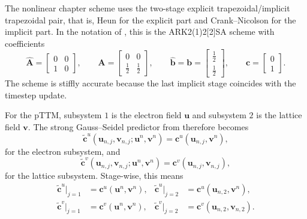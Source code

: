 The nonlinear chapter scheme uses the two-stage explicit trapezoidal/implicit trapezoidal pair, that is, Heun for the explicit part and Crank--Nicolson for the implicit part. In the notation of \cite{Kennedy_2003,Ascher_1997}, this is the ARK2(1)2[2]SA scheme with coefficients
\begin{equation}
    \hat{\mathbf{A}}
    =
    \begin{bmatrix}
        0 & 0 \\
        1 & 0
    \end{bmatrix},
    \qquad
    \mathbf{A}
    =
    \begin{bmatrix}
        0           & 0           \\
        \frac{1}{2} & \frac{1}{2}
    \end{bmatrix},
    \qquad
    \hat{\mathbf{b}}
    =
    \mathbf{b}
    =
    \begin{bmatrix}
        \frac{1}{2} \\
        \frac{1}{2}
    \end{bmatrix},
    \qquad
    \mathbf{c}
    =
    \begin{bmatrix}
        0 \\
        1
    \end{bmatrix}.
    \label{eq:app-imex-ark-coeffs}
\end{equation}
The scheme is stiffly accurate because the last implicit stage coincides with the timestep update.

For the pTTM, subsystem \(1\) is the electron field \(\mathbf{u}\) and subsystem \(2\) is the lattice field \(\mathbf{v}\). The strong Gauss--Seidel predictor from \cite[Algorithm~5]{Huang_2019} therefore becomes
\begin{equation}
    \tilde{\mathbf{c}}^{u}(\mathbf{u}_{n,j},\mathbf{v}_{n,j}; \mathbf{u}^{n},\mathbf{v}^{n})
    =
    \mathbf{c}^{u}(\mathbf{u}_{n,j},\mathbf{v}^{n}),
    \label{eq:app-imex-predictor-u}
\end{equation}
for the electron subsystem, and
\begin{equation}
    \tilde{\mathbf{c}}^{v}(\mathbf{u}_{n,j},\mathbf{v}_{n,j}; \mathbf{u}^{n},\mathbf{v}^{n})
    =
    \mathbf{c}^{v}(\mathbf{u}_{n,j},\mathbf{v}_{n,j}),
    \label{eq:app-imex-predictor-v}
\end{equation}
for the lattice subsystem. Stage-wise, this means
\begin{align}
    \tilde{\mathbf{c}}^{u}\big|_{j=1}
     & =
    \mathbf{c}^{u}(\mathbf{u}^{n},\mathbf{v}^{n}),
     &
    \tilde{\mathbf{c}}^{u}\big|_{j=2}
     & =
    \mathbf{c}^{u}(\mathbf{u}_{n,2},\mathbf{v}^{n}),
    \label{eq:app-imex-predictor-stage-u} \\
    \tilde{\mathbf{c}}^{v}\big|_{j=1}
     & =
    \mathbf{c}^{v}(\mathbf{u}^{n},\mathbf{v}^{n}),
     &
    \tilde{\mathbf{c}}^{v}\big|_{j=2}
     & =
    \mathbf{c}^{v}(\mathbf{u}_{n,2},\mathbf{v}_{n,2}).
    \label{eq:app-imex-predictor-stage-v}
\end{align}

